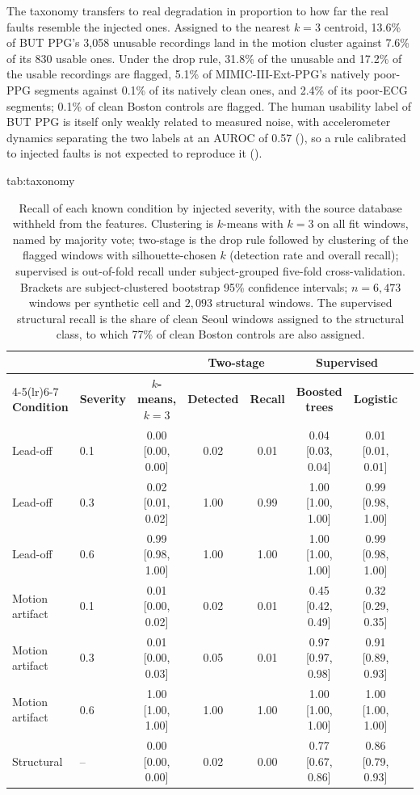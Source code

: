 \documentclass[pmlr,twocolumn,10pt]{jmlr}
\begin{document}
The taxonomy transfers to real degradation in proportion to how far the real faults resemble the injected ones. Assigned to the nearest $k=3$ centroid, 13.6\% of BUT PPG's 3,058 unusable recordings land in the motion cluster against 7.6\% of its 830 usable ones. Under the drop rule, 31.8\% of the unusable and 17.2\% of the usable recordings are flagged, 5.1\% of MIMIC-III-Ext-PPG's natively poor-PPG segments against 0.1\% of its natively clean ones, and 2.4\% of its poor-ECG segments; 0.1\% of clean Boston controls are flagged. The human usability label of BUT PPG is itself only weakly related to measured noise, with accelerometer dynamics separating the two labels at an AUROC of 0.57 (), so a rule calibrated to injected faults is not expected to reproduce it ().

\begin{table}[t]
\floatconts
  {tab:taxonomy}%
  {\caption{Recall of each known condition by injected severity, with the source database withheld from the features. Clustering is $k$-means with $k=3$ on all fit windows, named by majority vote; two-stage is the drop rule followed by clustering of the flagged windows with silhouette-chosen $k$ (detection rate and overall recall); supervised is out-of-fold recall under subject-grouped five-fold cross-validation. Brackets are subject-clustered bootstrap 95\% confidence intervals; $n=6{,}473$ windows per synthetic cell and $2{,}093$ structural windows. The supervised structural recall is the share of clean Seoul windows assigned to the structural class, to which 77\% of clean Boston controls are also assigned.}}%
  {\footnotesize\setlength{\tabcolsep}{3pt}
  \begin{tabular*}{\linewidth}{@{\extracolsep{\fill}}llcccccc@{}}
  \toprule
  & & & \multicolumn{2}{c}{\textbf{Two-stage}} & \multicolumn{2}{c}{\textbf{Supervised}} \\
  \cmidrule(lr){4-5}\cmidrule(lr){6-7}
  \textbf{Condition} & \textbf{Severity} & \textbf{$k$-means, $k=3$} & \textbf{Detected} & \textbf{Recall} & \textbf{Boosted trees} & \textbf{Logistic} \\
  \midrule
  Lead-off & 0.1 & 0.00 [0.00, 0.00] & 0.02 & 0.01 & 0.04 [0.03, 0.04] & 0.01 [0.01, 0.01] \\
  Lead-off & 0.3 & 0.02 [0.01, 0.02] & 1.00 & 0.99 & 1.00 [1.00, 1.00] & 0.99 [0.98, 1.00] \\
  Lead-off & 0.6 & 0.99 [0.98, 1.00] & 1.00 & 1.00 & 1.00 [1.00, 1.00] & 0.99 [0.98, 1.00] \\
  Motion artifact & 0.1 & 0.01 [0.00, 0.02] & 0.02 & 0.01 & 0.45 [0.42, 0.49] & 0.32 [0.29, 0.35] \\
  Motion artifact & 0.3 & 0.01 [0.00, 0.03] & 0.05 & 0.01 & 0.97 [0.97, 0.98] & 0.91 [0.89, 0.93] \\
  Motion artifact & 0.6 & 1.00 [1.00, 1.00] & 1.00 & 1.00 & 1.00 [1.00, 1.00] & 1.00 [1.00, 1.00] \\
  Structural & -- & 0.00 [0.00, 0.00] & 0.02 & 0.00 & 0.77 [0.67, 0.86] & 0.86 [0.79, 0.93] \\
  \bottomrule
  \end{tabular*}}
\end{table}
\end{document}

